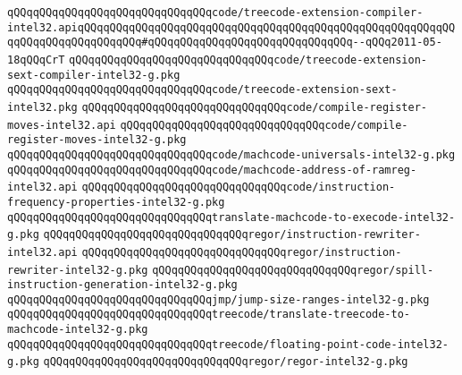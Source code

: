 \verb|qQQqqQQqqQQqqQQqqQQqqQQqqQQqqQQqcode/treecode-extension-compiler-intel32.apiqQQqqQQqqQQqqQQqqQQqqQQqqQQqqQQqqQQqqQQqqQQqqQQqqQQqqQQqqQQqqQQqqQQqqQQqqQQqqQQq#qQQqqQQqqQQqqQQqqQQqqQQqqQQqqQQq--qQQq2011-05-18qQQqCrT|\newline
\verb|qQQqqQQqqQQqqQQqqQQqqQQqqQQqqQQqcode/treecode-extension-sext-compiler-intel32-g.pkg|\newline
\verb|qQQqqQQqqQQqqQQqqQQqqQQqqQQqqQQqcode/treecode-extension-sext-intel32.pkg|\newline
\verb|qQQqqQQqqQQqqQQqqQQqqQQqqQQqqQQqcode/compile-register-moves-intel32.api|\newline
\verb|qQQqqQQqqQQqqQQqqQQqqQQqqQQqqQQqcode/compile-register-moves-intel32-g.pkg|\newline
\verb|qQQqqQQqqQQqqQQqqQQqqQQqqQQqqQQqcode/machcode-universals-intel32-g.pkg|\newline
\verb|qQQqqQQqqQQqqQQqqQQqqQQqqQQqqQQqcode/machcode-address-of-ramreg-intel32.api|\newline
\verb|qQQqqQQqqQQqqQQqqQQqqQQqqQQqqQQqcode/instruction-frequency-properties-intel32-g.pkg|\newline
\verb|qQQqqQQqqQQqqQQqqQQqqQQqqQQqqQQqtranslate-machcode-to-execode-intel32-g.pkg|\newline
\verb|qQQqqQQqqQQqqQQqqQQqqQQqqQQqqQQqregor/instruction-rewriter-intel32.api|\newline
\verb|qQQqqQQqqQQqqQQqqQQqqQQqqQQqqQQqregor/instruction-rewriter-intel32-g.pkg|\newline
\verb|qQQqqQQqqQQqqQQqqQQqqQQqqQQqqQQqregor/spill-instruction-generation-intel32-g.pkg|\newline
\verb|qQQqqQQqqQQqqQQqqQQqqQQqqQQqqQQqjmp/jump-size-ranges-intel32-g.pkg|\newline
\verb|qQQqqQQqqQQqqQQqqQQqqQQqqQQqqQQqtreecode/translate-treecode-to-machcode-intel32-g.pkg|\newline
\verb|qQQqqQQqqQQqqQQqqQQqqQQqqQQqqQQqtreecode/floating-point-code-intel32-g.pkg|\newline
\verb|qQQqqQQqqQQqqQQqqQQqqQQqqQQqqQQqregor/regor-intel32-g.pkg|\newline

